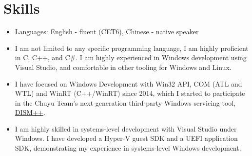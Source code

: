 \documentclass{resume}
\begin{document}
\section{Skills}
\begin{itemize}
  \item Languages: English - fluent (CET6), Chinese - native speaker
  \item I am not limited to any specific programming language, I am highly proficient in C, C++, and C\#. I am highly experienced in Windows development using Visual Studio, and comfortable in other tooling for Windows and Linux.
  \item I have focused on Windows Development with Win32 API, COM (ATL and WTL) and WinRT (C++/WinRT) since 2014, which I started to participate in the Chuyu Team's next generation third-party Windows servicing tool, \href{https://github.com/Chuyu-Team/Dism-Multi-language/releases/tag/v10.1.1002.2}{DISM++}.
  \item I am highly skilled in systems-level development with Visual Studio under Windows. I have developed a Hyper-V guest SDK and a UEFI application SDK, demonstrating my experience in systems-level Windows development.
\end{itemize}
\end{document}
